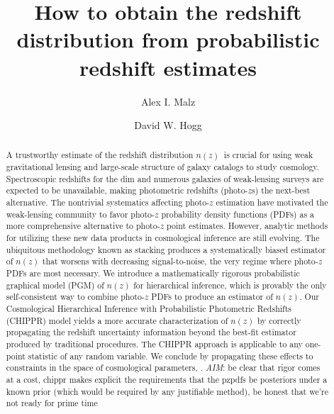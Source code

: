 \documentclass[iop]{emulateapj}
\newcommand{\todo}[3]{{\color{#2}\emph{#1}: #3}}
\newcommand{\aim}[1]{\todo{AIM}{red}{#1}}
\newcommand{\project}[1]{{\textsc{#1}}}
\newcommand{\Chippr}{\project{CHIPPR}}
\newcommand{\nz}{$n(z)$}
\begin{document}

\title{How to obtain the redshift distribution from probabilistic redshift estimates}

\author{Alex I. Malz}
\author{David W. Hogg}


\begin{abstract}
A trustworthy estimate of the redshift distribution \nz\ is crucial for using weak gravitational lensing and large-scale structure of galaxy catalogs to study cosmology.
Spectroscopic redshifts for the dim and numerous galaxies of weak-lensing surveys are expected to be unavailable, making photometric redshifts (photo-$z$s) the next-best alternative.
The nontrivial systematics affecting photo-$z$ estimation have motivated the weak-lensing community to favor photo-$z$ probability density functions (PDFs) as a more comprehensive alternative to photo-$z$ point estimates.
However, analytic methods for utilizing these new data products in cosmological inference are still evolving.
The ubiquitous methodology known as stacking produces a systematically biased estimator of $n(z)$ that worsens with decreasing signal-to-noise, the very regime where photo-$z$ PDFs are most necessary.
We introduce a mathematically rigorous probabilistic graphical model (PGM) of $n(z)$ for hierarchical inference, which is provably the only self-consistent way to combine photo-$z$ PDFs to produce an estimator of $n(z)$.
Our Cosmological Hierarchical Inference with Probabilistic Photometric Redshifts (\Chippr) model yields a more accurate characterization of $n(z)$ by correctly propagating the redshift uncertainty information beyond the best-fit estimator produced by traditional procedures.
The CHIPPR approach is applicable to any one-point statistic of any random variable.
We conclude by propagating these effects to constraints in the space of cosmological parameters, .
\aim{be clear that rigor comes at a cost, chippr makes explicit the requirements that the pzpdfs be posteriors under a known prior (which would be required by any justifiable method), be honest that we're not ready for prime time}
\end{abstract}
\end{document}
